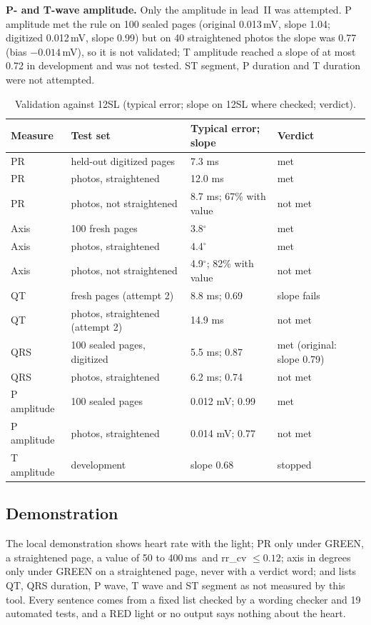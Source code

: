 \documentclass[11pt,a4paper]{article}
\newcommand{\ms}{\,ms}
\newcommand{\mV}{\,mV}
\begin{document}
\textbf{P- and T-wave amplitude.} Only the amplitude in lead~II was attempted. P amplitude met the rule on 100 sealed pages (original 0.013\mV, slope 1.04; digitized 0.012\mV, slope 0.99) but on 40 straightened photos the slope was 0.77 (bias $-0.014$\mV), so it is not validated; T amplitude reached a slope of at most 0.72 in development and was not tested. ST segment, P duration and T duration were not attempted.

\begin{table}[ht]
\caption{Validation against 12SL (typical error; slope on 12SL where checked; verdict).}
\label{tab:valid}
\centering\small
\begin{tabular}{llll}
\toprule
Measure & Test set & Typical error; slope & Verdict \\
\midrule
PR & held-out digitized pages & 7.3 ms & met \\
PR & photos, straightened & 12.0 ms & met \\
PR & photos, not straightened & 8.7 ms; 67\% with value & not met \\
Axis & 100 fresh pages & 3.8$^\circ$ & met \\
Axis & photos, straightened & 4.4$^\circ$ & met \\
Axis & photos, not straightened & 4.9$^\circ$; 82\% with value & not met \\
QT & fresh pages (attempt 2) & 8.8 ms; 0.69 & slope fails \\
QT & photos, straightened (attempt 2) & 14.9 ms & not met \\
QRS & 100 sealed pages, digitized & 5.5 ms; 0.87 & met (original: slope 0.79) \\
QRS & photos, straightened & 6.2 ms; 0.74 & not met \\
P amplitude & 100 sealed pages & 0.012 mV; 0.99 & met \\
P amplitude & photos, straightened & 0.014 mV; 0.77 & not met \\
T amplitude & development & slope 0.68 & stopped \\
\bottomrule
\end{tabular}
\end{table}

\subsection{Demonstration}
The local demonstration shows heart rate with the light; PR only under GREEN, a straightened page, a value of 50 to 400\ms\ and rr\_cv $\le0.12$; axis in degrees only under GREEN on a straightened page, never with a verdict word; and lists QT, QRS duration, P wave, T wave and ST segment as not measured by this tool. Every sentence comes from a fixed list checked by a wording checker and 19 automated tests, and a RED light or no output says nothing about the heart.
\end{document}
